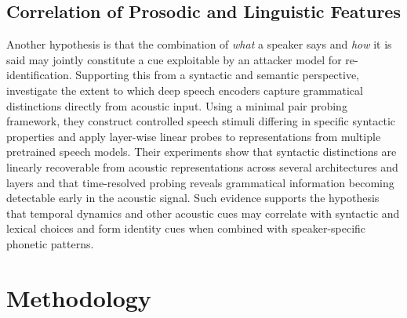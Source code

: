 \documentclass[12pt,leqno,a4paper]{article}
\begin{document}
 \subsection{Correlation of Prosodic and Linguistic Features}
 
Another hypothesis is that the combination of \textit{what} a speaker says and \textit{how} it is said may jointly constitute a cue exploitable by 
an attacker model for re-identification. Supporting this from a syntactic and semantic perspective, \cite{he_layer-wise_2025} investigate the extent 
to which deep speech encoders capture grammatical distinctions directly from acoustic input. Using a minimal pair probing framework, they construct 
controlled speech stimuli differing in specific syntactic properties and apply layer-wise linear probes to representations from multiple pretrained 
speech models. Their experiments show that syntactic distinctions are linearly recoverable from acoustic representations across several architectures 
and layers and that time-resolved probing reveals grammatical information becoming detectable early in the acoustic signal. 
Such evidence supports the hypothesis that temporal dynamics and other acoustic cues may correlate with syntactic and lexical choices and form identity cues when combined with speaker-specific 
phonetic patterns.

\section{Methodology}
\label{sec:methodology}


\end{document}
